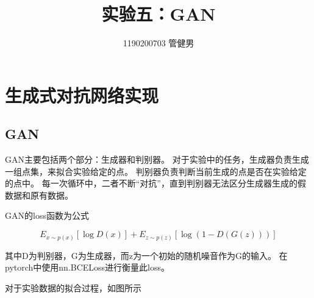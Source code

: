 \documentclass{article}
\title{实验五：GAN}
\author{1190200703 管健男}
\date{}
\begin{document}
\maketitle

\section{生成式对抗网络实现}

\subsection{GAN}

GAN主要包括两个部分：生成器和判别器。
对于实验中的任务，生成器负责生成一组点集，来拟合实验给定的点。
判别器负责判断当前生成的点是否在实验给定的点中。
每一次循环中，二者不断“对抗”，直到判别器无法区分生成器生成的假数据和原有数据。

GAN的loss函数为公式

\begin{equation}
    E_{x\sim p(x)}[\log D(x)] + E_{z\sim p(z)}[\log (1-D(G(z)))]
\end{equation}

其中D为判别器，G为生成器，而z为一个初始的随机噪音作为G的输入。
在pytorch中使用nn.BCELoss进行衡量此loss。

对于实验数据的拟合过程，如图所示
\end{document}
